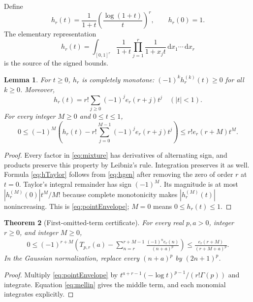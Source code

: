 \documentclass[11pt]{article}
\numberwithin{equation}{section}
\newtheorem{theorem}{Theorem}[section]
\newtheorem{lemma}[theorem]{Lemma}
\theoremstyle{definition}\newtheorem{definition}[theorem]{Definition}
\theoremstyle{remark}\newtheorem{remark}[theorem]{Remark}
\newcommand{\dd}{\,\mathrm d}
\begin{document}
Define
\begin{equation}\label{eq:h}
 h_r(t)=\frac1{1+t}\left(\frac{\log(1+t)}t\right)^r,
 \qquad h_r(0)=1.
\end{equation}
The elementary representation
\begin{equation}\label{eq:mixture}
 h_r(t)=\int_{[0,1]^r}\frac1{1+t}\prod_{j=1}^r\frac1{1+x_jt}
                  \dd x_1\cdots\dd x_r
\end{equation}
is the source of the signed bounds.

\begin{lemma}\label{lem:CM}
For $t\ge0$, $h_r$ is completely monotone: $(-1)^k h_r^{(k)}(t)\ge0$ for all $k\ge0$. Moreover,
\begin{equation}\label{eq:hTaylor}
 h_r(t)=r!\sum_{j\ge0}(-1)^j e_r(r+j)t^j\quad (|t|<1).
\end{equation}
For every integer $M\ge0$ and $0\le t\le1$,
\begin{equation}\label{eq:pointEnvelope}
 0\le(-1)^M\left(h_r(t)-r!\sum_{j=0}^{M-1}(-1)^je_r(r+j)t^j\right)
       \le r!e_r(r+M)t^M.
\end{equation}
\end{lemma}
\begin{proof}
Every factor in \eqref{eq:mixture} has derivatives of alternating sign, and products preserve this property by Leibniz's rule. Integration preserves it as well. Formula \eqref{eq:hTaylor} follows from \eqref{eq:hgen} after removing the zero of order $r$ at $t=0$. Taylor's integral remainder has sign $(-1)^M$. Its magnitude is at most $|h_r^{(M)}(0)|t^M/M!$ because complete monotonicity makes $|h_r^{(M)}(t)|$ nonincreasing. This is \eqref{eq:pointEnvelope}; $M=0$ means $0\le h_r(t)\le1$.
\end{proof}

\begin{theorem}[First-omitted-term certificate]\label{thm:envelope}
For every real $p,a>0$, integer $r\ge0$, and integer $M\ge0$,
\begin{align}\label{eq:Tenvelope}
0\le(-1)^{r+M}\left(
 T_{p,r}(a)-\sum_{n=r}^{r+M-1}\frac{(-1)^ne_r(n)}{(n+a)^p}
 \right)
 \le \frac{e_r(r+M)}{(r+M+a)^p}.
\end{align}
In the Gaussian normalization, replace every $(n+a)^p$ by $(2n+1)^p$.
\end{theorem}
\begin{proof}
Multiply \eqref{eq:pointEnvelope} by
$t^{a+r-1}(-\log t)^{p-1}/(r!\Gamma(p))$ and integrate. Equation \eqref{eq:mellin} gives the middle term, and each monomial integrates explicitly.
\end{proof}
\end{document}
